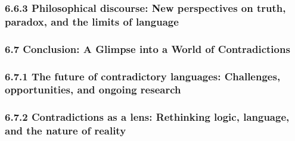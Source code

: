 \hypertarget{philosophical-discourse-new-perspectives-on-truth-paradox-and-the-limits-of-language}{%
\subsubsection*{6.6.3 Philosophical discourse: New perspectives on
truth, paradox, and the limits of
language}\label{philosophical-discourse-new-perspectives-on-truth-paradox-and-the-limits-of-language}}

\hypertarget{conclusion-a-glimpse-into-a-world-of-contradictions}{%
\subsubsection*{\texorpdfstring{\textbf{6.7 Conclusion: A Glimpse into a
World of Contradictions}
}{6.7 Conclusion: A Glimpse into a World of Contradictions }}\label{conclusion-a-glimpse-into-a-world-of-contradictions}}

\hypertarget{the-future-of-contradictory-languages-challenges-opportunities-and-ongoing-research}{%
\subsubsection*{\texorpdfstring{6.7.1 The future of contradictory
languages: Challenges, opportunities, and ongoing research
}{6.7.1 The future of contradictory languages: Challenges, opportunities, and ongoing research }}\label{the-future-of-contradictory-languages-challenges-opportunities-and-ongoing-research}}

\hypertarget{contradictions-as-a-lens-rethinking-logic-language-and-the-nature-of-reality}{%
\subsubsection*{6.7.2 Contradictions as a lens: Rethinking logic,
language, and the nature of
reality}\label{contradictions-as-a-lens-rethinking-logic-language-and-the-nature-of-reality}}

\hypertarget{section}{%
\subsubsection*{}\label{section}}

